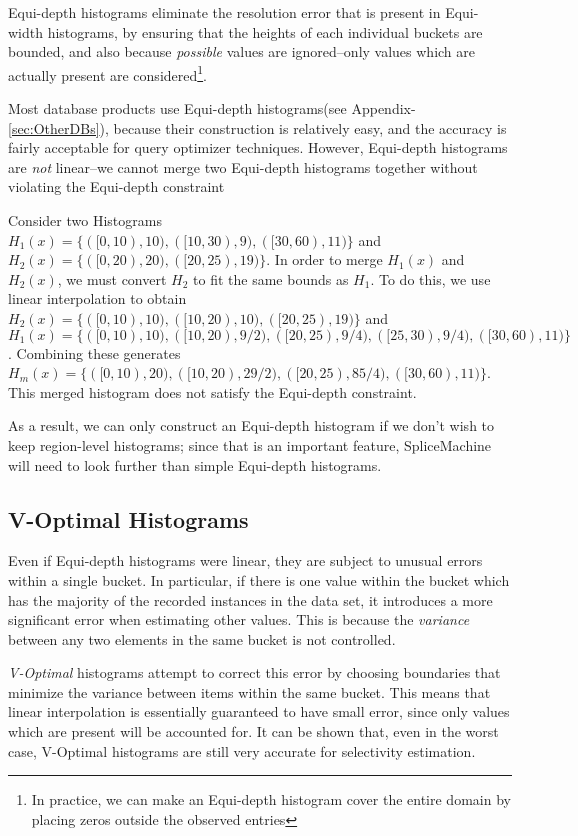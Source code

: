 Equi-depth histograms eliminate the resolution error that is present in Equi-width histograms, by ensuring that the heights of each individual buckets are bounded, and also because \emph{possible} values are ignored--only values which are actually present are considered\footnote{In practice, we can make an Equi-depth histogram cover the entire domain by placing zeros outside the observed entries}.

Most database products use Equi-depth histograms(see Appendix-\ref{sec:OtherDBs}), because their construction is relatively easy, and the accuracy is fairly acceptable for query optimizer techniques. However, Equi-depth histograms are \emph{not} linear--we cannot merge two Equi-depth histograms together without violating the Equi-depth constraint

\begin{exmp}
				Consider two Histograms $H_1(x) = \lbrace ([0,10),10),([10,30),9),([30,60),11) \rbrace$ and $H_2(x) = \lbrace ([0,20),20),([20,25),19) \rbrace$. In order to merge $H_1(x)$ and $H_2(x)$, we must convert $H_2$ to fit the same bounds as $H_1$. To do this, we use linear interpolation to obtain $H_2(x) = \lbrace ([0,10),10),([10,20),10),([20,25),19) \rbrace$ and $H_1(x) = \lbrace ([0,10),10),([10,20),9/2),([20,25),9/4),([25,30),9/4),([30,60),11) \rbrace$. Combining these generates $H_m(x) = \lbrace ([0,10),20),([10,20),29/2),([20,25),85/4),([30,60),11) \rbrace$. This merged histogram does not satisfy the Equi-depth constraint.
\end{exmp}

As a result, we can only construct an Equi-depth histogram if we don't wish to keep region-level histograms; since that is an important feature, SpliceMachine will need to look further than simple Equi-depth histograms.

\subsection{V-Optimal Histograms}
\label{sec:VOptimal}
Even if Equi-depth histograms were linear, they are subject to unusual errors within a single bucket. In particular, if there is one value within the bucket which has the majority of the recorded instances in the data set, it introduces a more significant error when estimating other values. This is because the \emph{variance} between any two elements in the same bucket is not controlled.

\emph{V-Optimal} histograms attempt to correct this error by choosing boundaries that minimize the variance between items within the same bucket. This means that linear interpolation is essentially guaranteed to have small error, since only values which are present will be accounted for. It can be shown that, even in the worst case, V-Optimal histograms are still very accurate for selectivity estimation\cite{JagadishOptimalHistograms}.

